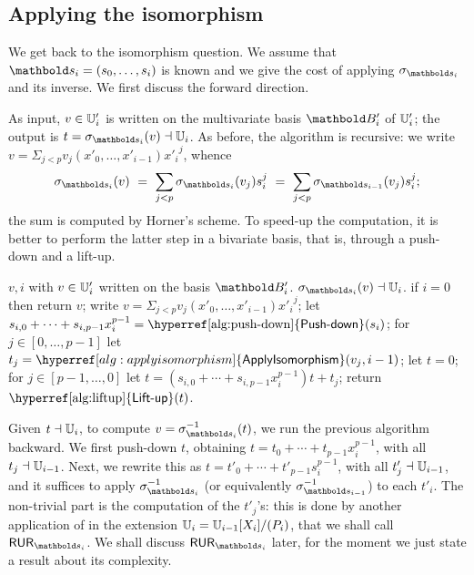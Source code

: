 
\subsection{Applying the isomorphism}

We get back to the isomorphism question. We assume that
$\lst{s}_i=(s_0,\dots,s_i)$ is known and we give the cost of applying
$\sigma_{\lst{s}_i}$ and its inverse.  We first discuss the forward
direction.

As input, $v \in \mathbb{U}'_i$ is written on the multivariate basis $\basis{B}'_i$
of $\mathbb{U}'_i$; the output is $t=\sigma_{\lst{s}_i}(v) \wrt \U_i$. As before,
the algorithm is recursive: we write $v=\Sigma_{j <p}
v_j(x'_0,\dots,x'_{i-1}) {x'_i}^j$, whence
\begin{equation}
  \sigma_{\lst{s}_i}(v)\ =\ \sum_{j
    <p} \sigma_{\lst{s}_i}(v_j) s_i^j\ =\ \sum_{j
    <p} \sigma_{\lst{s}_{i-1}}(v_j) s_i^j
  \text{;}
\end{equation}
the sum is computed by Horner's scheme.  To speed-up the computation,
it is better to perform the latter step in a bivariate basis, that is,
through a push-down and a lift-up.


\begin{algorithm}
  \caption{\label{alg:applyisomorphism}} 
  \begin{algorithmic}[1]
    \REQUIRE $v,i$ with $v\in \mathbb{U}'_i$ written on the basis $\basis{B}'_i$.
    \ENSURE $\sigma_{\lst{s}_i}(v) \wrt \U_i$.
    \STATE if $i=0$ then return $v$;
    \STATE write $v=\Sigma_{j <p} v_j(x'_0,\dots,x'_{i-1}) {x'_i}^j$;
    \STATE let $s_{i,0}+\cdots+s_{i,p-1}x_i^{p-1}=\text{\hyperref[alg:push-down]{\alg{Push-down}}}(s_i)$;
    \STATE for $j \in [0,\dots,p-1]$ let $t_j=\hyperref[alg:applyisomorphism]{\alg{ApplyIsomorphism}}(v_j,i-1)$;
    \STATE let $t=0$;
    \STATE  for $j \in [p-1,\dots,0]$ let $t=(s_{i,0}+\cdots+s_{i,p-1}x_i^{p-1})t+t_j$;
    \STATE return $\text{\hyperref[alg:liftup]{\alg{Lift-up}}}(t)$.
  \end{algorithmic}
\end{algorithm}

Given $t \dashv \mathbb{U}_i$, to compute $v=\sigma_{\lst{s}_i}^{-1}(t)$, we run
the previous algorithm backward. We first push-down $t$, obtaining
$t=t_0 + \cdots + t_{p-1}x_i^{p-1}$, with all $t_j \dashv
\mathbb{U}_{i-1}$. Next, we rewrite this as $t=t'_0+\cdots +
t'_{p-1}s_i^{p-1}$, with all $t'_j \dashv \mathbb{U}_{i-1}$, and it suffices to
apply $\sigma_{\lst{s}_i}^{-1}$ (or equivalently
$\sigma_{\lst{s}_{i-1}}^{-1}$) to each $t'_i$. The non-trivial part is
the computation of the $t'_j$'s: this is done by another application
of \hyperref[alg:rur]{} in the extension $\mathbb{U}_i= \mathbb{U}_{i-1}[X_i]/(P_i)$, that we
shall call \hyperref[alg:RUR-si]{$\alg{RUR}_{\lst{s}_i}$}. We shall
discuss \hyperref[alg:RUR-si]{$\alg{RUR}_{\lst{s}_i}$} later, for the
moment we just state a result about its complexity.


